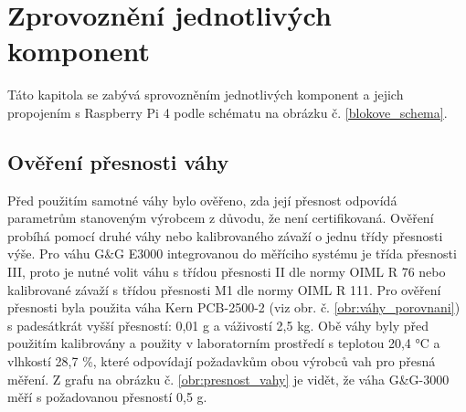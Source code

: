 
\chapter{Zprovoznění jednotlivých komponent}
\label{Zprovoznění jednotlivých komponent}
Táto kapitola se zabývá sprovozněním jednotlivých komponent a jejich propojením s Raspberry Pi 4 podle schématu na obrázku č. \ref{blokove_schema}.

\section{Ověření přesnosti váhy}

Před použitím samotné váhy bylo ověřeno, zda její přesnost odpovídá parametrům stanoveným výrobcem z důvodu, že není certifikovaná. Ověření probíhá pomocí druhé váhy nebo kalibrovaného závaží o jednu třídy přesnosti výše. Pro váhu G\&G E3000 integrovanou do měříciho systému je třída přesnosti III, proto je nutné volit váhu s třídou přesnosti II dle normy OIML R 76 nebo kalibrované závaží s třídou přesnosti M1 dle normy OIML R 111. Pro ověření přesnosti byla použita váha Kern PCB-2500-2 (viz obr. č. \ref{obr:váhy_porovnani}) s padesátkrát vyšší přesností: 0,01 g a váživostí 2,5 kg. Obě váhy byly před použitím kalibrovány a použity v laboratorním prostředí s teplotou 20,4 °C a vlhkostí 28,7 \%, které odpovídají požadavkům obou výrobců vah pro přesná měření. Z grafu na obrázku č. \ref{obr:presnost_vahy} je vidět, že váha G\&G-3000 měří s požadovanou přesností 0,5 g.





